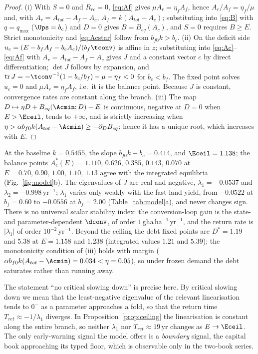\begin{proof}
(i) With $S=0$ and $R_{rc}=0$, \eqref{eq:Af} gives $\mu A_r=\eta_fA_f$, hence $A_r/A_f=\eta_f/\mu$ and, with $A_r=A_{tot}-A_f-A_c$, $A_f=k(A_{tot}-A_c)$; substituting into \eqref{eq:B} with $q=q_{\max}$ ($\Ups=b_c$) and $D=0$ gives $B=B_{eq}(A_c)$, and $S=0$ requires $B\ge E$. Strict monotonicity and \eqref{eq:Acstar} follow from $b_{f0}k>b_c$. (ii) On the deficit side $u_c=(E-b_fA_f-b_cA_c)/(b_f\tconv)$ is affine in $z$; substituting into \eqref{eq:Ac}--\eqref{eq:Af} with $A_r=A_{tot}-A_f-A_c$ gives $J$ and a constant vector $c$ by direct differentiation; $\det J$ follows by expansion, and $\operatorname{tr}J=-\tconv^{-1}(1-b_c/b_f)-\mu-\eta_f<0$ for $b_c<b_f$. The fixed point solves $u_c=0$ and $\mu A_r=\eta_fA_f$, i.e.\ it is the balance point. Because $J$ is constant, convergence rates are constant along the branch. (iii) The map $D\mapsto\eta D+B_{eq}(\Acmin;D)-E$ is continuous, negative at $D=0$ when $E>\Eceil$, tends to $+\infty$, and is strictly increasing when $\eta>\alpha b_{f0}k(A_{tot}-\Acmin)\ge-\partial_DB_{eq}$; hence it has a unique root, which increases with $E$.
\end{proof}

At the baseline $k=0.5455$, the slope $b_{f0}k-b_c=0.414$, and $\Eceil=1.138$; the balance points $A_c^*(E)=1.110,\,0.626,\,0.385,\,0.143,\,0.070$ at $E=0.70,\,0.90,\,1.00,\,1.10,\,1.13$ agree with the integrated equilibria (Fig.~\ref{fig:model}b). The eigenvalues of $J$ are real and negative, $\lambda_1=-0.0537$ and $\lambda_2=-0.998\,\mathrm{yr}^{-1}$; $\lambda_1$ varies only weakly with the fast-land yield, from $-0.0522$ at $b_f=0.60$ to $-0.0556$ at $b_f=2.00$ (Table~\ref{tab:model}a), and never changes sign. There is no universal scalar stability index: the conversion-loop gain is the state- and parameter-dependent $\dconv$, of order $1\,\mathrm{gha\,ha^{-1}\,yr^{-1}}$, and the return rate is $|\lambda_1|$ of order $10^{-2}\,\mathrm{yr}^{-1}$. Beyond the ceiling the debt fixed points are $D^*=1.19$ and $5.38$ at $E=1.158$ and $1.238$ (integrated values $1.21$ and $5.39$); the monotonicity condition of (iii) holds with margin ($\alpha b_{f0}k(A_{tot}-\Acmin)=0.034<\eta=0.05$), so under frozen demand the debt saturates rather than running away.

The statement ``no critical slowing down'' is precise here. By critical slowing down we mean that the least-negative eigenvalue of the relevant linearisation tends to $0^-$ as a parameter approaches a fold, so that the return time $T_{ret}\approx-1/\lambda_1$ diverges. In Proposition~\ref{prop:ceiling} the linearisation is constant along the entire branch, so neither $\lambda_1$ nor $T_{ret}\approx19$\,yr changes as $E\to\Eceil$. The only early-warning signal the model offers is a \emph{boundary} signal, the capital book approaching its typed floor, which is observable only in the two-book series.

